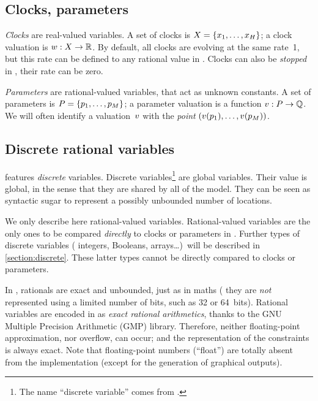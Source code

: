 \subsection{Clocks, parameters}

\emph{Clocks} are real-valued variables.
A set of clocks is $X = \{ x_1, \dots, x_H \}$;
a clock valuation is
$w : X \rightarrow \mathbb R$.
By default, all clocks are evolving at the same rate~1, but this rate can be defined to any rational value in \imitator{}.
Clocks can also be \emph{stopped} in \imitator{}, \ie{} their rate can be zero.

\emph{Parameters} are rational-valued variables, that act as unknown constants.
A set of parameters is $P = \{ p_1, \dots, p_M \} $;
a parameter valuation is a function $v : P \rightarrow \mathbb Q$.
We will often identify a valuation~$v$ with the \emph{point} $(v(p_1), \dots, v(p_{M}))$.


\subsection{Discrete rational variables}\label{subsection:rational}

\imitator{} features \emph{discrete} variables.
%
Discrete variables\footnote{%
	The name ``discrete variable'' comes from \hytech{}.
}
are global variables.
Their value is global, in the sense that they are shared by all \IPTA{} of the model.
They can be seen as syntactic sugar to represent a possibly unbounded number of locations.

We only describe here rational-valued variables.
Rational-valued variables are the only ones to be compared \emph{directly} to clocks or parameters in \imitator{}.
Further types of discrete variables (\eg{} integers, Booleans, arrays…)\ will be described in \cref{section:discrete}.
These latter types cannot be directly compared to clocks or parameters.

In \imitator{}, rationals are exact and unbounded, just as in maths (\ie{} they are \emph{not} represented using a limited number of bits, such as 32 or 64~bits).
%
Rational variables are encoded in \imitator{} as \emph{exact rational arithmetics}, thanks to the GNU Multiple Precision Arithmetic (GMP) library.
Therefore, neither floating-point approximation, nor overflow, can occur;
%
and the representation of the constraints is always exact.
Note that floating-point numbers (``float'') are totally absent from the \imitator{} implementation (except for the generation of graphical outputs).

